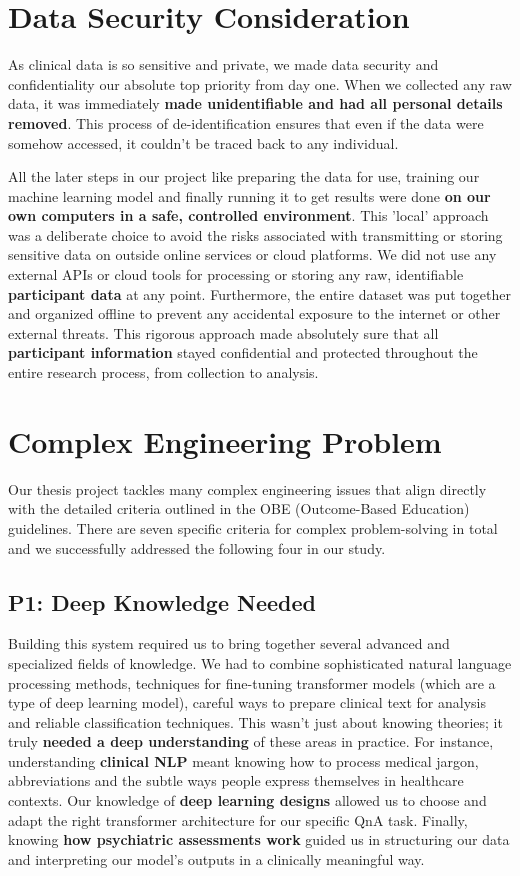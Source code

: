 \section{Data Security Consideration}
As clinical data is so sensitive and private, we made data security and confidentiality our absolute top priority from day one. When we collected any raw data, it was immediately \textbf{made unidentifiable and had all personal details removed}. This process of de-identification ensures that even if the data were somehow accessed, it couldn't be traced back to any individual.

All the later steps in our project like preparing the data for use, training our machine learning model and finally running it to get results were done \textbf{on our own computers in a safe, controlled environment}. This 'local' approach was a deliberate choice to avoid the risks associated with transmitting or storing sensitive data on outside online services or cloud platforms. We did not use any external APIs or cloud tools for processing or storing any raw, identifiable \textbf{participant data} at any point. Furthermore, the entire dataset was put together and organized offline to prevent any accidental exposure to the internet or other external threats. This rigorous approach made absolutely sure that all \textbf{participant information} stayed confidential and protected throughout the entire research process, from collection to analysis.


\section{Complex Engineering Problem}
Our thesis project tackles many complex engineering issues that align directly with the detailed criteria outlined in the OBE (Outcome-Based Education) guidelines. There are seven specific criteria for complex problem-solving in total and we successfully addressed the following four in our study.

\subsection{P1: Deep Knowledge Needed}
Building this system required us to bring together several advanced and specialized fields of knowledge. We had to combine sophisticated natural language processing methods, techniques for fine-tuning transformer models (which are a type of deep learning model), careful ways to prepare clinical text for analysis and reliable classification techniques. This wasn't just about knowing theories; it truly \textbf{needed a deep understanding} of these areas in practice. For instance, understanding \textbf{clinical NLP} meant knowing how to process medical jargon, abbreviations and the subtle ways people express themselves in healthcare contexts. Our knowledge of \textbf{deep learning designs} allowed us to choose and adapt the right transformer architecture for our specific QnA task. Finally, knowing \textbf{how psychiatric assessments work} guided us in structuring our data and interpreting our model's outputs in a clinically meaningful way.

